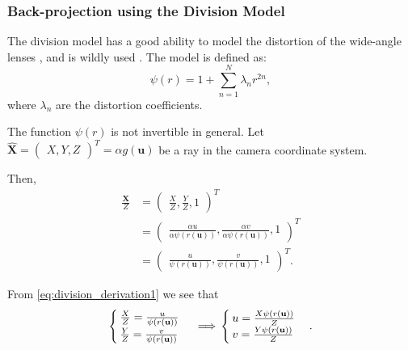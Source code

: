 \subsubsection{Back-projection using the Division Model}\label{subsub:back_projection_using_the_division_model}

The division model has a good ability to model the distortion of the wide-angle
lenses \citep{fitzgibbonSimultaneousLinearEstimation2001}, and is wildly used \citep{prittsMinimalSolversRectifying2021,
	scaramuzzaFlexibleTechniqueAccurate2006}. The model is defined as:
\begin{equation}
	\psi(r) = 1 + \sum_{n = 1}^{N} \lambda_n r^{2n},
\end{equation}
where \(\lambda_n\) are the distortion coefficients.

The function \(\psi(r)\) is not invertible in general.
Let \(\mathbf{\widehat{X}} = \begin{pmatrix}
	X, Y, Z
\end{pmatrix}^{T} = \alpha g(\mathbf{u})\) be a ray in the camera coordinate system.

Then,
\begin{align}
	\frac{\mathbf{X}}{Z} & =
	\begin{pmatrix}
		\frac{X}{Z}, \frac{Y}{Z}, 1
	\end{pmatrix}^{T}                               \\                                  & =
	\begin{pmatrix}
		\frac{\alpha u}{\alpha \psi(r(\mathbf{u}))},
		\frac{\alpha v}{\alpha \psi(r(\mathbf{u}))},
		1
	\end{pmatrix}^{T}  \\
	                     & = \label{eq:division_derivation1}
	\begin{pmatrix}
		\frac{u}{\psi(r(\mathbf{u}))},
		\frac{v}{\psi(r(\mathbf{u}))},
		1
	\end{pmatrix}^{T}.
\end{align}

From \ref{eq:division_derivation1} we see that
\begin{equation} \label{eq:division_derivation2}
	\begin{cases}
		\frac{X}{Z} = \frac{u}{\psi(r(\mathbf{u}))} \\
		\frac{Y}{Z} = \frac{v}{\psi(r(\mathbf{u}))}
	\end{cases} \implies \\
	\begin{cases}
		u = \frac{X \psi(r(\mathbf{u}))}{Z} \\
		v = \frac{Y \psi(r(\mathbf{u}))}{Z}
	\end{cases}.
\end{equation}

